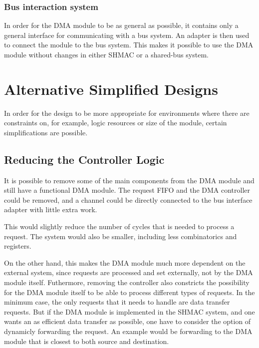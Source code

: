 \subsubsection{Bus interaction system}
In order for the DMA module to be as general as possible, it contains only a general
interface for communicating with a bus system. An adapter is then used to connect
the module to the bus system. This makes it possible to use the DMA module without
changes in either SHMAC or a shared-bus system.

\section{Alternative Simplified Designs} 

In order for the design to be more appropriate for environments where there are
constraints on, for example, logic resources or size of the module, certain simplifications
are possible.


\subsection{Reducing the Controller Logic}
It is possible to remove some of the main components from the DMA module and still
have a functional DMA module. The request FIFO and the DMA controller could be removed,
and a channel could be directly connected to the bus interface adapter with little
extra work.

This would slightly reduce the number of cycles that is needed to process a request.
The system would also be smaller, including less combinatorics and registers.

On the other hand, this makes the DMA module much more dependent on the external system, since requests are processed and set externally, not by the DMA module itself.
Futhermore, removing the controller also constricts the possibility for the DMA module itself to be able to process different types of requests.
In the minimum case, the only requests that it needs to handle are data transfer requests.
But if the DMA module is implemented in the SHMAC system, and one wants an as efficient data transfer as possible, one have to consider the option of dynamicly forwarding the request.
An example would be forwarding to the DMA module that is  closest to both source and destination.

